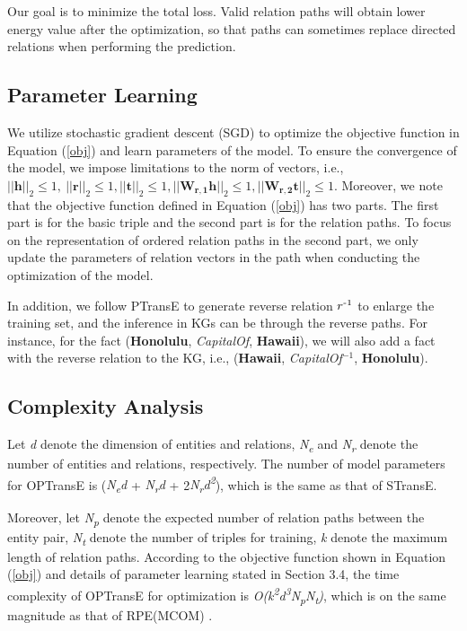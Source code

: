 \documentclass[11pt,a4paper]{article}
\begin{document}
Our goal is to minimize the total loss. Valid relation paths will
obtain lower energy value after the optimization, so that paths can
sometimes replace directed relations when performing the prediction.

\subsection{Parameter Learning}

We utilize stochastic gradient descent (SGD) to optimize the objective
function in Equation (\ref{obj}) and learn parameters of the model. To ensure the
convergence of the model, we impose limitations to the norm of
vectors, i.e., \(||\mathbf{h}{||}_{2} \leq 1,\ ||\mathbf{r}{||}_{2}
\leq 1,||\mathbf{t}{||}_{2} \leq
1,||\mathbf{W}_{\mathbf{r,1}}\mathbf{h}{||}_{2} \leq
1,||\mathbf{W}_{\mathbf{r,2}}\mathbf{t}{||}_{2} \leq 1.\) Moreover,
we note that the objective function defined in Equation (\ref{obj})
has two parts. The first part is for the basic triple and the second
part is for the relation paths. To focus on the representation of
ordered relation paths in the second part, we only update the
parameters of relation vectors in the path when conducting the
optimization of the model.

In addition, we follow PTransE \cite{lin2015modeling} to generate reverse
relation ${r\textsuperscript{-1}}$ to enlarge the training set, and
the inference in KGs can be through the reverse paths. For instance,
for the fact (\textbf{Honolulu}, \textsl{CapitalOf},
\textbf{Hawaii}), we will also add a fact with the reverse relation
to the KG, i.e., (\textbf{Hawaii}, \textsl{CapitalOf$^{-1}$},
\textbf{Honolulu}).


\subsection{Complexity Analysis}

Let \emph{d} denote the dimension of entities and relations,
\emph{N\textsubscript{e}} and \emph{N\textsubscript{r}} denote the
number of entities and relations, respectively. The number of model
parameters for OPTransE is (\emph{N\textsubscript{e}d} +
\emph{N\textsubscript{r}d} +
2\emph{N\textsubscript{r}d\textsuperscript{2}}), which is the same
as that of STransE.

Moreover, let \emph{N\textsubscript{p}} denote the expected number
of relation paths between the entity pair, \emph{N\textsubscript{t
}} denote the number of triples for training, \emph{k} denote the
maximum length of relation paths. According to the objective
function shown in Equation (\ref{obj}) and details of parameter
learning stated in Section 3.4, the time complexity of OPTransE for
optimization is
\emph{O(k\textsuperscript{2}d\textsuperscript{3}N\textsubscript{p}N\textsubscript{t})},
which is on the same magnitude as that of RPE(MCOM)
\cite{lin2018relation}.
\end{document}
